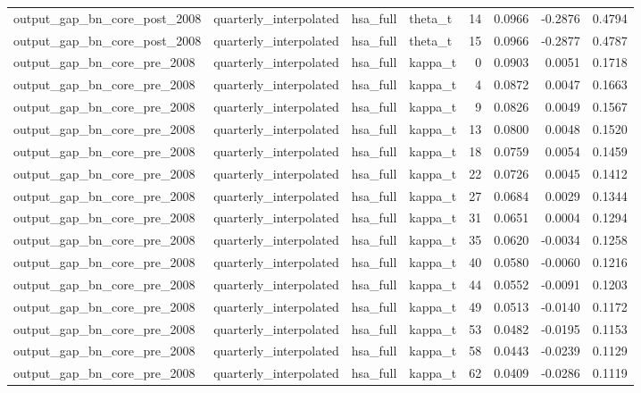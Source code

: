 \begin{tabular}{llllrrrr}
output\_gap\_bn\_core\_post\_2008 & quarterly\_interpolated & hsa\_full & theta\_t & 14 & 0.0966 & -0.2876 & 0.4794 \\
output\_gap\_bn\_core\_post\_2008 & quarterly\_interpolated & hsa\_full & theta\_t & 15 & 0.0966 & -0.2877 & 0.4787 \\
output\_gap\_bn\_core\_pre\_2008 & quarterly\_interpolated & hsa\_full & kappa\_t & 0 & 0.0903 & 0.0051 & 0.1718 \\
output\_gap\_bn\_core\_pre\_2008 & quarterly\_interpolated & hsa\_full & kappa\_t & 4 & 0.0872 & 0.0047 & 0.1663 \\
output\_gap\_bn\_core\_pre\_2008 & quarterly\_interpolated & hsa\_full & kappa\_t & 9 & 0.0826 & 0.0049 & 0.1567 \\
output\_gap\_bn\_core\_pre\_2008 & quarterly\_interpolated & hsa\_full & kappa\_t & 13 & 0.0800 & 0.0048 & 0.1520 \\
output\_gap\_bn\_core\_pre\_2008 & quarterly\_interpolated & hsa\_full & kappa\_t & 18 & 0.0759 & 0.0054 & 0.1459 \\
output\_gap\_bn\_core\_pre\_2008 & quarterly\_interpolated & hsa\_full & kappa\_t & 22 & 0.0726 & 0.0045 & 0.1412 \\
output\_gap\_bn\_core\_pre\_2008 & quarterly\_interpolated & hsa\_full & kappa\_t & 27 & 0.0684 & 0.0029 & 0.1344 \\
output\_gap\_bn\_core\_pre\_2008 & quarterly\_interpolated & hsa\_full & kappa\_t & 31 & 0.0651 & 0.0004 & 0.1294 \\
output\_gap\_bn\_core\_pre\_2008 & quarterly\_interpolated & hsa\_full & kappa\_t & 35 & 0.0620 & -0.0034 & 0.1258 \\
output\_gap\_bn\_core\_pre\_2008 & quarterly\_interpolated & hsa\_full & kappa\_t & 40 & 0.0580 & -0.0060 & 0.1216 \\
output\_gap\_bn\_core\_pre\_2008 & quarterly\_interpolated & hsa\_full & kappa\_t & 44 & 0.0552 & -0.0091 & 0.1203 \\
output\_gap\_bn\_core\_pre\_2008 & quarterly\_interpolated & hsa\_full & kappa\_t & 49 & 0.0513 & -0.0140 & 0.1172 \\
output\_gap\_bn\_core\_pre\_2008 & quarterly\_interpolated & hsa\_full & kappa\_t & 53 & 0.0482 & -0.0195 & 0.1153 \\
output\_gap\_bn\_core\_pre\_2008 & quarterly\_interpolated & hsa\_full & kappa\_t & 58 & 0.0443 & -0.0239 & 0.1129 \\
output\_gap\_bn\_core\_pre\_2008 & quarterly\_interpolated & hsa\_full & kappa\_t & 62 & 0.0409 & -0.0286 & 0.1119 \\

\end{tabular}
